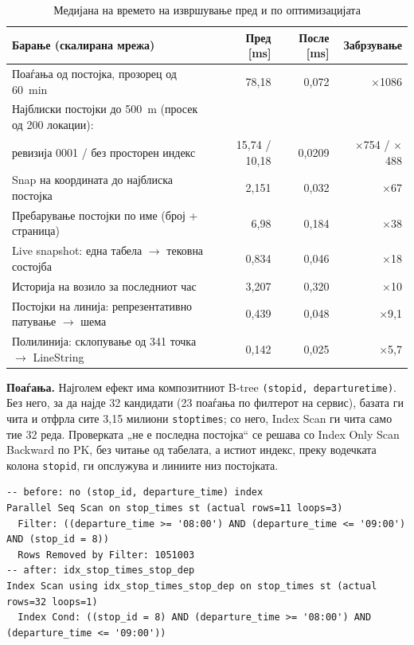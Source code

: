 \documentclass[11pt, a4paper]{article}
\renewcommand{\_}{\oldunderscore\allowbreak}
\newcommand{\code}[1]{\texttt{#1}}
\newcommand{\ra}{$\rightarrow$}
\begin{document}
\begin{table}[!htb]
\centering
\small
\begin{tabularx}{\textwidth}{@{}Xrrr@{}}
\toprule
\textbf{Барање (скалирана мрежа)} & \textbf{Пред [ms]} & \textbf{После [ms]} & \textbf{Забрзување} \\
\midrule
Поаѓања од постојка, прозорец од 60~min & 78,18 & 0,072 & $\times$1086 \\
Најблиски постојки до 500~m (просек од 200 локации): & & & \\
\quad ревизија 0001 / без просторен индекс & 15,74 / 10,18 & 0,0209 & $\times$754 / $\times$488 \\
Snap на координата до најблиска постојка & 2,151 & 0,032 & $\times$67 \\
Пребарување постојки по име (број + страница) & 6,98 & 0,184 & $\times$38 \\
Live snapshot: една табела \ra{} тековна состојба & 0,834 & 0,046 & $\times$18 \\
Историја на возило за последниот час & 3,207 & 0,320 & $\times$10 \\
Постојки на линија: репрезентативно патување \ra{} шема & 0,439 & 0,048 & $\times$9,1 \\
Полилинија: склопување од 341 точка \ra{} LineString & 0,142 & 0,025 & $\times$5,7 \\
\bottomrule
\end{tabularx}
\caption{Медијана на времето на извршување пред и по оптимизацијата}
\label{tab:results}
\end{table}

\textbf{Поаѓања.} Најголем ефект има композитниот B-tree \code{(stop\_id, departure\_time)}. Без него, за да најде 32 кандидати (23 поаѓања по филтерот на сервис), базата ги чита и отфрла сите 3,15 милиони \code{stop\_times}; со него, Index Scan ги чита само тие 32 реда. Проверката „не е последна постојка“ се решава со Index Only Scan Backward по PK, без читање од табелата, а истиот индекс, преку водечката колона \code{stop\_id}, ги опслужува и линиите низ постојката.

\begin{lstlisting}[language=plan, basicstyle=\ttfamily\scriptsize]
-- before: no (stop_id, departure_time) index
Parallel Seq Scan on stop_times st (actual rows=11 loops=3)
  Filter: ((departure_time >= '08:00') AND (departure_time <= '09:00') AND (stop_id = 8))
  Rows Removed by Filter: 1051003
-- after: idx_stop_times_stop_dep
Index Scan using idx_stop_times_stop_dep on stop_times st (actual rows=32 loops=1)
  Index Cond: ((stop_id = 8) AND (departure_time >= '08:00') AND (departure_time <= '09:00'))
\end{lstlisting}
\end{document}
